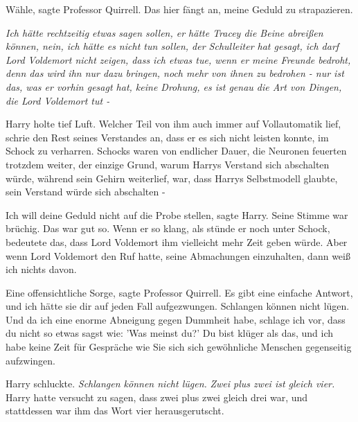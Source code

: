 \glqq{}Wähle\grqq{}, sagte Professor Quirrell. \glqq{}Das hier fängt an, meine
Geduld zu strapazieren.\grqq{}

\emph{Ich hätte rechtzeitig etwas sagen sollen, er hätte Tracey die Beine
abreißen können, nein, ich hätte es nicht tun sollen, der Schulleiter hat
gesagt, ich darf Lord Voldemort nicht zeigen, dass ich etwas tue, wenn er meine
Freunde bedroht, denn das wird ihn nur dazu bringen, noch mehr von ihnen zu
bedrohen - nur ist das, was er vorhin gesagt hat, keine Drohung, es ist genau
die Art von Dingen, die Lord Voldemort tut -}

Harry holte tief Luft. Welcher Teil von ihm auch immer auf Vollautomatik lief,
schrie den Rest seines Verstandes an, dass er es sich nicht leisten konnte, im
Schock zu verharren. Schocks waren von endlicher Dauer, die Neuronen feuerten
trotzdem weiter, der einzige Grund, warum Harrys Verstand sich abschalten würde,
während sein Gehirn weiterlief, war, dass Harrys Selbstmodell glaubte, sein
Verstand würde sich abschalten -

\glqq{}Ich will deine Geduld nicht auf die Probe stellen\grqq{}, sagte Harry.
Seine Stimme war brüchig. Das war gut so. Wenn er so klang, als stünde er noch
unter Schock, bedeutete das, dass Lord Voldemort ihm vielleicht mehr Zeit geben
würde. \glqq{}Aber wenn Lord Voldemort den Ruf hatte, seine Abmachungen
einzuhalten, dann weiß ich nichts davon.\grqq{}

\glqq{}Eine offensichtliche Sorge\grqq{}, sagte Professor Quirrell. \glqq{}Es gibt
eine einfache Antwort, und ich hätte sie dir auf jeden Fall aufgezwungen.
Schlangen können nicht lügen. Und da ich eine enorme Abneigung gegen Dummheit
habe, schlage ich vor, dass du nicht so etwas sagst wie: 'Was meinst du?' Du
bist klüger als das, und ich habe keine Zeit für Gespräche wie Sie sich sich
gewöhnliche Menschen gegenseitig aufzwingen.\grqq{}

Harry schluckte. \emph{Schlangen können nicht lügen.} \emph{\glqq{}Zwei plus zwei
ist gleich vier.\grqq{}} Harry hatte versucht zu sagen, dass zwei plus zwei
gleich drei war, und stattdessen war ihm das Wort vier herausgerutscht.

